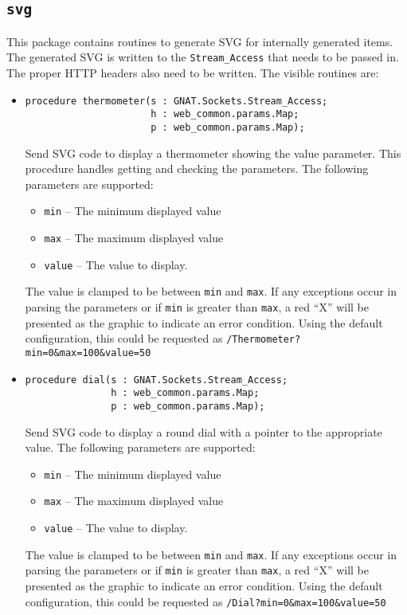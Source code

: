 \documentclass[10pt, openany, draft]{article}
\begin{document}
\subsection{\texttt{svg}}
This package contains routines to generate SVG for internally generated items.  The generated SVG is written to the \texttt{Stream\_Access} that needs to be passed in.  The proper HTTP headers also need to be written.  The visible routines are:
\begin{itemize}
  \item \begin{verbatim}
procedure thermometer(s : GNAT.Sockets.Stream_Access;
                      h : web_common.params.Map;
                      p : web_common.params.Map);
\end{verbatim}
  Send SVG code to display a thermometer showing the value parameter.  This procedure handles getting and checking the parameters.  The following parameters are supported:
  \begin{itemize}
    \item \texttt{min} -- The minimum displayed value
    \item \texttt{max} -- The maximum displayed value
    \item \texttt{value} -- The value to display.
  \end{itemize}
  The value is clamped to be between \texttt{min} and \texttt{max}.  If any exceptions occur in parsing the parameters or if \texttt{min} is greater than \texttt{max}, a red ``X'' will be presented as the graphic to indicate an error condition.  Using the default configuration, this could be requested as \texttt{/Thermometer?min=0\&max=100\&value=50}
  \item \begin{verbatim}
procedure dial(s : GNAT.Sockets.Stream_Access;
               h : web_common.params.Map;
               p : web_common.params.Map);
\end{verbatim}
  Send SVG code to display a round dial with a pointer to the appropriate value. The following parameters are supported:
  \begin{itemize}
    \item \texttt{min} -- The minimum displayed value
    \item \texttt{max} -- The maximum displayed value
    \item \texttt{value} -- The value to display.
  \end{itemize}
  The value is clamped to be between \texttt{min} and \texttt{max}.  If any exceptions occur in parsing the parameters or if \texttt{min} is greater than \texttt{max}, a red ``X'' will be presented as the graphic to indicate an error condition.  Using the default configuration, this could be requested as \texttt{/Dial?min=0\&max=100\&value=50}
\end{itemize}
\end{document}
